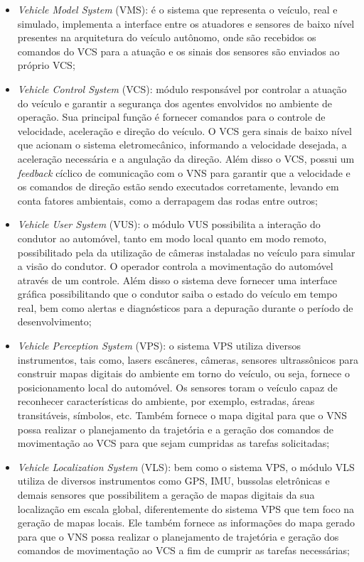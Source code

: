 \documentclass[conference]{IEEEtran}
\begin{document}
\begin{itemize}
	\item \textit{Vehicle Model System} (VMS): é o sistema que representa o veículo, real e simulado, implementa a interface entre os atuadores e sensores de baixo nível presentes na arquitetura do veículo autônomo, onde são recebidos os comandos do VCS para a atuação e os sinais dos sensores são enviados ao próprio VCS;
	
	\item \textit{Vehicle Control System} (VCS): módulo responsável por controlar a atuação do veículo e garantir a segurança dos agentes envolvidos no ambiente de operação. Sua principal função é fornecer comandos para o controle de velocidade, aceleração e direção do veículo. O VCS gera sinais de baixo nível que acionam o sistema eletromecânico, informando a velocidade desejada, a aceleração necessária e a angulação da direção. Além disso o VCS, possui um \textit{feedback} cíclico de comunicação com o VNS para garantir que a velocidade e os comandos de direção estão sendo executados corretamente, levando em conta fatores ambientais, como a derrapagem das rodas entre outros;
	
	\item \textit{Vehicle User System} (VUS): o módulo VUS possibilita a interação do condutor ao automóvel, tanto em modo local quanto em modo remoto, possibilitado pela da utilização de câmeras instaladas no veículo para simular a visão do condutor. O operador controla a movimentação do automóvel através de um controle. Além disso o sistema deve fornecer uma interface gráfica possibilitando que o condutor saiba o estado do veículo em tempo real, bem como alertas e diagnósticos para a depuração durante o período de desenvolvimento;  
	
	\item \textit{Vehicle Perception System} (VPS): o sistema VPS utiliza diversos instrumentos, tais como, lasers escâneres, câmeras, sensores ultrassônicos para construir mapas digitais do ambiente em torno do veículo, ou seja, fornece o posicionamento local do automóvel. Os sensores toram o veículo capaz de reconhecer características do ambiente, por exemplo, estradas, áreas transitáveis, símbolos, etc. Também fornece o mapa digital para que o VNS possa realizar o planejamento da trajetória e a geração dos comandos de movimentação ao VCS para que sejam cumpridas as tarefas solicitadas;
	
	\item \textit{Vehicle Localization System} (VLS): bem como o sistema VPS, o módulo VLS utiliza de diversos instrumentos como GPS, IMU, bussolas eletrônicas e demais sensores que possibilitem a geração de mapas digitais da sua localização em escala global, diferentemente do sistema VPS que tem foco na geração de mapas locais. Ele também fornece as informações do mapa gerado para que o VNS possa realizar o planejamento de trajetória e geração dos comandos de movimentação ao VCS a fim de cumprir as tarefas necessárias;
	

\end{itemize}
\end{document}
